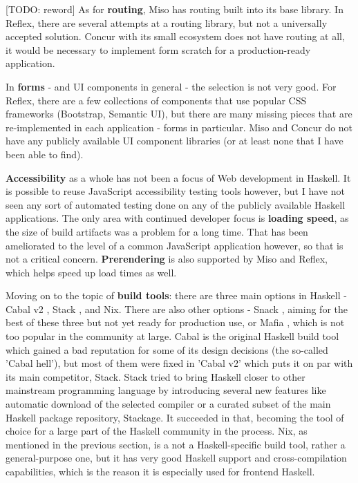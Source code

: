 \documentclass[english,odsaz]{fitthesis}
\begin{document}
[TODO: reword] As for \textbf{routing}, Miso has routing built into its base library. In Reflex, there
are several attempts at a routing library, but not a universally accepted
solution. Concur with its small ecosystem does not have routing at all, it would
be necessary to implement form scratch for a production-ready application.

In \textbf{forms} - and UI components in general - the selection is not very good. For
Reflex, there are a few collections of components that use popular CSS
frameworks (Bootstrap, Semantic UI), but there are many missing pieces that are
re-implemented in each application - forms in particular. Miso and Concur do not
have any publicly available UI component libraries (or at least none that I have
been able to find).

\textbf{Accessibility} as a whole has not been a focus of Web development in Haskell. It
is possible to reuse JavaScript accessibility testing tools however, but I have
not seen any sort of automated testing done on any of the publicly available
Haskell applications. The only area with continued developer focus is \textbf{loading
speed}, as the size of build artifacts was a problem for a long time. That has
been ameliorated to the level of a common JavaScript application however, so
that is not a critical concern. \textbf{Prerendering} is also supported by Miso and
Reflex, which helps speed up load times as well.

Moving on to the topic of \textbf{build tools}: there are three main options in Haskell -
Cabal v2 \cite{cabal}, Stack \cite{stack}, and Nix. There are also other options -
Snack \cite{snack}, aiming for the best of these three but not yet ready for
production use, or Mafia \cite{mafia}, which is not too popular in the community
at large. Cabal is the original Haskell build tool which gained a bad reputation
for some of its design decisions (the so-called 'Cabal hell'), but most of them
were fixed in 'Cabal v2' which puts it on par with its main competitor,
Stack. Stack tried to bring Haskell closer to other mainstream programming
language by introducing several new features like automatic download of the
selected compiler or a curated subset of the main Haskell package repository,
Stackage. It succeeded in that, becoming the tool of choice for a large part of
the Haskell community in the process. Nix, as mentioned in the previous section,
is a not a Haskell-specific build tool, rather a general-purpose one, but it
has very good Haskell support and cross-compilation capabilities, which is the
reason it is especially used for frontend Haskell.
\end{document}
